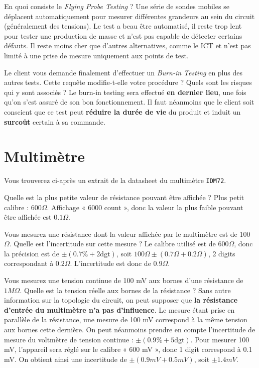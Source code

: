 \documentclass{exam}
\begin{document}
{
	En quoi consiste le \textit{Flying Probe Testing} ?
}
{
	Une série de sondes mobiles se déplacent automatiquement pour mesurer différentes grandeurs au sein du circuit (généralement des tensions).
	Le test a beau être automatisé, il reste trop lent pour tester une production de masse et n'est pas capable de détecter certains défauts.
	Il reste moins cher que d'autres alternatives, comme le ICT et n'est pas limité à une prise de mesure uniquement aux points de test.
}


{
	Le client vous demande finalement d'effectuer un \textit{Burn-in Testing} en plus des autres tests. Cette requête modifie-t-elle votre procédure ? Quels sont les risques qui y sont associés ?
}
{
	Le burn-in testing sera effectué \textbf{en dernier lieu}, une fois qu'on s'est assuré de son bon fonctionnement.
	Il faut néanmoins que le client soit conscient que ce test peut \textbf{réduire la durée de vie} du produit et induit un \textbf{surcoût} certain à sa commande.
}
\clearpage


\section{Multimètre}
Vous trouverez ci-après un extrait de la datasheet du multimètre \texttt{IDM72}.


{
Quelle est la plus petite valeur de résistance pouvant être affichée ?
}
{
	Plus petit calibre : $600\Omega$. Affichage « 6000 count », donc la valeur la plus faible pouvant être affichée est $0.1\Omega$.
}

{
Vous mesurez une résistance dont la valeur affichée par le multimètre est de 100 $\Omega$.
Quelle est l'incertitude sur cette mesure ?
}
{
	Le calibre utilisé est de $600\Omega$, donc la précision est de $\pm(0.7\%+2\mbox{dgt})$, soit $100\Omega \pm (0.7\Omega + 0.2 \Omega)$, 2 digits correspondant à $0.2 \Omega$.
	L'incertitude est donc de $0.9\Omega$.
}

{
	Vous mesurez une tension continue de 100 mV aux bornes d'une résistance de $1 M\Omega$.
	Quelle est la tension réelle aux bornes de la résistance ?
}
{
	Sans autre information sur la topologie du circuit, on peut supposer que \textbf{la résistance d'entrée du multimètre n'a pas d'influence}. Le mesure étant prise en parallèle de la résistance, une mesure de 100 mV correspond à la même tension aux bornes cette dernière.
	On peut néanmoins prendre en compte l'incertitude de mesure du voltmètre de tension continue : $\pm(0.9\%+5\mbox{dgt})$. Pour mesurer 100 mV, l'appareil sera réglé sur le calibre « 600 mV », donc 1 digit correspond à 0.1 mV.
	On obtient ainsi une incertitude de $\pm(0.9 mV + 0.5 mV)$, soit \textbf{$\pm 1.4 mV$}.
}

\label{pdf:idm72}
\clearpage

\end{document}
